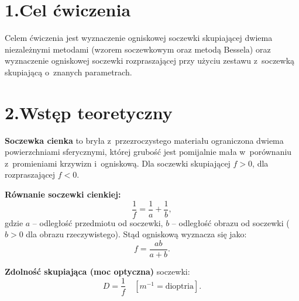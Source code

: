 \documentclass[a4paper,12pt]{article}
\title{}
\date{}
\begin{document}


\section*{1.\quad Cel ćwiczenia}

Celem ćwiczenia jest wyznaczenie ogniskowej soczewki skupiającej dwiema niezależnymi
metodami (wzorem soczewkowym oraz metodą Bessela) oraz wyznaczenie ogniskowej soczewki
rozpraszającej przy użyciu zestawu z~soczewką skupiającą o~znanych parametrach.

\section*{2.\quad Wstęp teoretyczny}

\textbf{Soczewka cienka} to bryła z~przezroczystego materiału ograniczona dwiema
powierzchniami sferycznymi, której grubość jest pomijalnie mała w~porównaniu
z~promieniami krzywizn i~ogniskową. Dla soczewki skupiającej $f > 0$, dla
rozpraszającej $f < 0$.

\textbf{Równanie soczewki cienkiej:}
\begin{equation}
  \frac{1}{f} = \frac{1}{a} + \frac{1}{b},
  \label{eq:soczewka}
\end{equation}
gdzie $a$ -- odległość przedmiotu od soczewki, $b$ -- odległość obrazu od soczewki
($b > 0$ dla obrazu rzeczywistego). Stąd ogniskową wyznacza się jako:
\begin{equation}
  f = \frac{ab}{a + b}.
  \label{eq:f_ab}
\end{equation}

\textbf{Zdolność skupiająca (moc optyczna)} soczewki:
\begin{equation}
  D = \frac{1}{f} \quad \left[\si{m^{-1}} = \text{dioptria}\right].
\end{equation}
\end{document}
